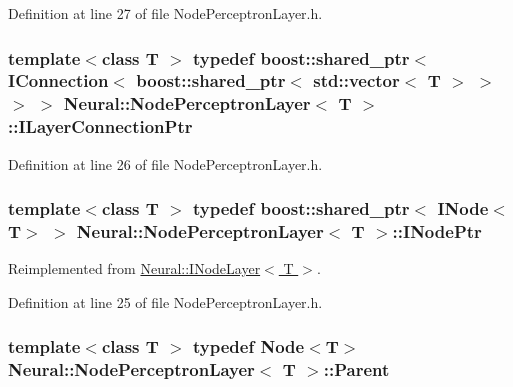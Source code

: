 Definition at line 27 of file NodePerceptronLayer.h.

\hypertarget{class_neural_1_1_node_perceptron_layer_a846a430dabc450603ae134904a083750}{
\subsubsection[{ILayerConnectionPtr}]{\setlength{\rightskip}{0pt plus 5cm}template$<$class T $>$ typedef boost::shared\_\-ptr$<$ {\bf IConnection}$<$ boost::shared\_\-ptr$<$ std::vector$<$ T $>$ $>$ $>$ $>$ {\bf Neural::NodePerceptronLayer}$<$ T $>$::{\bf ILayerConnectionPtr}}}
\label{class_neural_1_1_node_perceptron_layer_a846a430dabc450603ae134904a083750}


Definition at line 26 of file NodePerceptronLayer.h.

\hypertarget{class_neural_1_1_node_perceptron_layer_a17e54e010c5b9ba97031895320275e6c}{
\subsubsection[{INodePtr}]{\setlength{\rightskip}{0pt plus 5cm}template$<$class T $>$ typedef boost::shared\_\-ptr$<$ {\bf INode}$<$T$>$ $>$ {\bf Neural::NodePerceptronLayer}$<$ T $>$::{\bf INodePtr}}}
\label{class_neural_1_1_node_perceptron_layer_a17e54e010c5b9ba97031895320275e6c}


Reimplemented from \hyperlink{class_neural_1_1_i_node_layer_a31357b3a61112d5c534c52693ffba054}{Neural::INodeLayer$<$ T $>$}.



Definition at line 25 of file NodePerceptronLayer.h.

\hypertarget{class_neural_1_1_node_perceptron_layer_a927edb9291ccfeae974e6048221ae34b}{
\subsubsection[{Parent}]{\setlength{\rightskip}{0pt plus 5cm}template$<$class T $>$ typedef {\bf Node}$<$T$>$ {\bf Neural::NodePerceptronLayer}$<$ T $>$::{\bf Parent}}}
\label{class_neural_1_1_node_perceptron_layer_a927edb9291ccfeae974e6048221ae34b}



